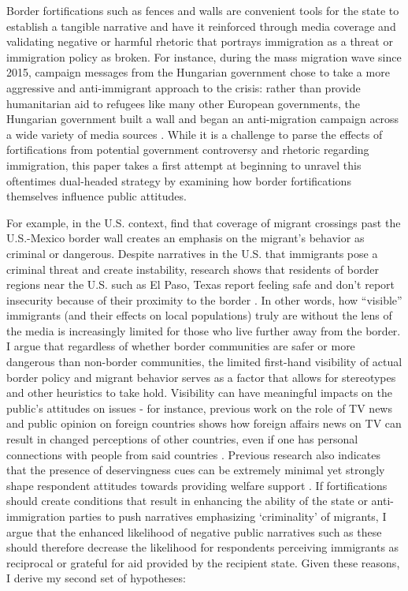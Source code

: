 \documentclass[12pt,]{article}
\begin{document}
Border fortifications such as fences and walls are convenient tools for
the state to establish a tangible narrative and have it reinforced
through media coverage and validating negative or harmful rhetoric that
portrays immigration as a threat or immigration policy as broken. For
instance, during the mass migration wave since 2015, campaign messages
from the Hungarian government chose to take a more aggressive and
anti-immigrant approach to the crisis: rather than provide humanitarian
aid to refugees like many other European governments, the Hungarian
government built a wall and began an anti-migration campaign across a
wide variety of media sources \citep{bajomi-lazar2019}. While it is a
challenge to parse the effects of fortifications from potential
government controversy and rhetoric regarding immigration, this paper
takes a first attempt at beginning to unravel this oftentimes
dual-headed strategy by examining how border fortifications themselves
influence public attitudes.

For example, in the U.S. context, \citet{jaramillo-dent2021} find that
coverage of migrant crossings past the U.S.-Mexico border wall creates
an emphasis on the migrant's behavior as criminal or dangerous. Despite
narratives in the U.S. that immigrants pose a criminal threat and create
instability, research shows that residents of border regions near the
U.S. such as El Paso, Texas report feeling safe and don't report
insecurity because of their proximity to the border
\citep{castaneda2020}. In other words, how ``visible'' immigrants (and
their effects on local populations) truly are without the lens of the
media is increasingly limited for those who live further away from the
border. I argue that regardless of whether border communities are safer
or more dangerous than non-border communities, the limited first-hand
visibility of actual border policy and migrant behavior serves as a
factor that allows for stereotypes and other heuristics to take hold.
Visibility can have meaningful impacts on the public's attitudes on
issues - for instance, previous work on the role of TV news and public
opinion on foreign countries shows how foreign affairs news on TV can
result in changed perceptions of other countries, even if one has
personal connections with people from said countries
\citep{semetko1992}. Previous research also indicates that the presence
of deservingness cues can be extremely minimal yet strongly shape
respondent attitudes towards providing welfare support
\citep{aaroe2014}. If fortifications should create conditions that
result in enhancing the ability of the state or anti-immigration parties
to push narratives emphasizing `criminality' of migrants, I argue that
the enhanced likelihood of negative public narratives such as these
should therefore decrease the likelihood for respondents perceiving
immigrants as reciprocal or grateful for aid provided by the recipient
state. Given these reasons, I derive my second set of hypotheses:
\end{document}
